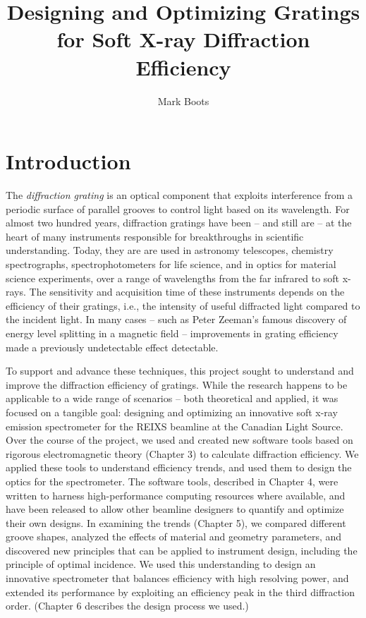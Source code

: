 \documentclass[12pt]{uofsthesis-cs}
\title{Designing and Optimizing Gratings for Soft X-ray Diffraction Efficiency}
\author{Mark Boots}
\begin{document}
\maketitle

\frontmatter


\chapter{Introduction}

The \emph{diffraction grating} is an optical component that exploits interference from a periodic surface of parallel grooves to control light based on its wavelength.  For almost two hundred years, diffraction gratings have been -- and still are -- at the heart of many instruments responsible for breakthroughs in scientific understanding.  Today, they are are used in astronomy telescopes, chemistry spectrographs, spectrophotometers for life science, and in optics for material science experiments, over a range of wavelengths from the far infrared to soft x-rays.  The sensitivity and acquisition time of these instruments depends on the efficiency of their gratings, i.e., the intensity of useful diffracted light compared to the incident light.  In many cases -- such as Peter Zeeman's famous discovery of energy level splitting in a magnetic field -- improvements in grating efficiency made a previously undetectable effect detectable.

To support and advance these techniques, this project sought to understand and improve the diffraction efficiency of gratings.  While the research happens to be applicable to a wide range of scenarios -- both theoretical and applied, it was focused on a tangible goal: designing and optimizing an innovative soft x-ray emission spectrometer for the REIXS beamline at the Canadian Light Source.  Over the course of the project, we used and created new software tools based on rigorous electromagnetic theory (Chapter 3) to calculate diffraction efficiency.  We applied these tools to understand efficiency trends, and used them to design the optics for the spectrometer.  The software tools, described in Chapter 4, were written to harness high-performance computing resources where available, and have been released to allow other beamline designers to quantify and optimize their own designs.  In examining the trends (Chapter 5), we compared different groove shapes, analyzed the effects of material and geometry parameters, and discovered new principles that can be applied to instrument design, including the principle of optimal incidence.  We used this understanding to design an innovative spectrometer that balances efficiency with high resolving power, and extended its performance by exploiting an efficiency peak in the third diffraction order.  (Chapter 6 describes the design process we used.)
\end{document}

